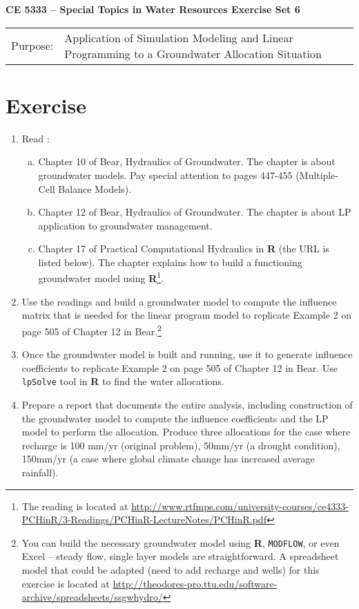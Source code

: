 \documentclass[12pt]{article}
\begin{document}
\begin{center}
{\textbf{{ CE 5333 -- Special Topics in Water Resources}  {Exercise Set 6}}}
\end{center}
\begingroup
\begin{tabular}{p{1in} p{5in}}
Purpose: & Application of Simulation Modeling and Linear Programming to a Groundwater Allocation Situation  \\
\end{tabular}
\endgroup
\section*{\small{Exercise}}
\begin{enumerate}
\item Read :
\begin{enumerate}[a)]
\item Chapter 10 of Bear, Hydraulics of Groundwater.  The chapter is about groundwater models. Pay special attention to pages 447-455 (Multiple-Cell Balance Models).  
\item Chapter 12 of Bear, Hydraulics of Groundwater.  The chapter is about LP application to groundwater management.  
\item Chapter 17 of Practical Computational Hydraulics in \textbf{R} (the URL is listed below).  The chapter explains how to build a functioning groundwater model using \textbf{R}\footnote{The reading is located at \url{http://www.rtfmps.com/university-courses/ce4333-PCHinR/3-Readings/PCHinR-LectureNotes/PCHinR.pdf}}. 
\end{enumerate}
\item Use the readings and build a groundwater model to compute the influence matrix that is needed for the linear program model to replicate Example 2 on page 505 of Chapter 12 in Bear.\footnote{You can build the necessary groundwater model using \textbf{R}, \texttt{MODFLOW}, or even Excel -- steady flow, single layer models are straightforward.  A spreadsheet model that could be adapted (need to add recharge and wells) for this exercise is located at
\url{http://theodores-pro.ttu.edu/software-archive/spreadsheets/ssgwhydro/}}
\item Once the groundwater model is built and running, use it to generate influence coefficients to replicate Example 2 on page 505 of Chapter 12 in Bear.  Use \texttt{lpSolve} tool in \textbf{R} to find the water allocations.
\item Prepare a report that documents the entire analysis, including construction of the groundwater model to compute the influence coefficients and the LP model to perform the allocation.  Produce three allocations for the case where recharge is 100 mm/yr (original problem), 50mm/yr (a drought condition), 150mm/yr (a case where global climate change has increased average rainfall).
\end{enumerate}
\end{document}
